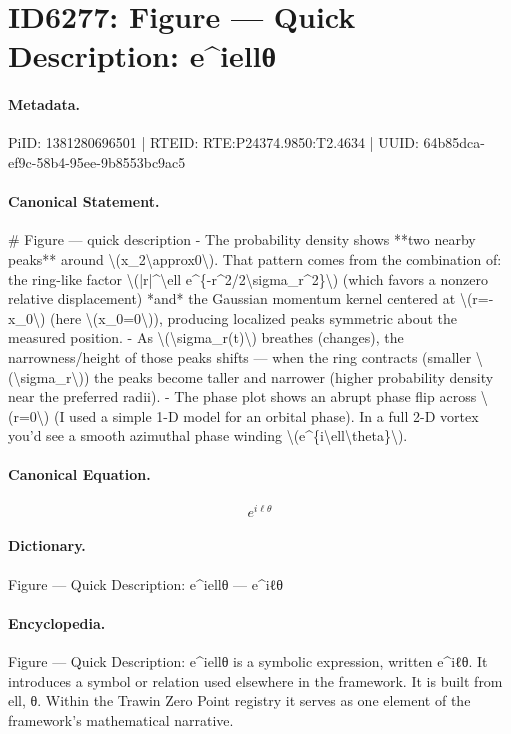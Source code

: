 \section*{ID6277: Figure — Quick Description: e\textasciicircum{}iellθ}
\paragraph{Metadata.}
PiID: 1381280696501 | RTEID: RTE:P24374.9850:T2.4634 | UUID: 64b85dca-ef9c-58b4-95ee-9b8553bc9ac5

\paragraph{Canonical Statement.}
\# Figure — quick description - The probability density shows **two nearby peaks** around \textbackslash{}(x\_2\textbackslash{}approx0\textbackslash{}). That pattern comes from the combination of: the ring-like factor \textbackslash{}(|r|\textasciicircum{}\textbackslash{}ell e\textasciicircum{}\{-r\textasciicircum{}2/2\textbackslash{}sigma\_r\textasciicircum{}2\}\textbackslash{}) (which favors a nonzero relative displacement) *and* the Gaussian momentum kernel centered at \textbackslash{}(r=-x\_0\textbackslash{}) (here \textbackslash{}(x\_0=0\textbackslash{})), producing localized peaks symmetric about the measured position. - As \textbackslash{}(\textbackslash{}sigma\_r(t)\textbackslash{}) breathes (changes), the narrowness/height of those peaks shifts — when the ring contracts (smaller \textbackslash{}(\textbackslash{}sigma\_r\textbackslash{})) the peaks become taller and narrower (higher probability density near the preferred radii). - The phase plot shows an abrupt phase flip across \textbackslash{}(r=0\textbackslash{}) (I used a simple 1-D model for an orbital phase). In a full 2-D vortex you’d see a smooth azimuthal phase winding \textbackslash{}(e\textasciicircum{}\{i\textbackslash{}ell\textbackslash{}theta\}\textbackslash{}).

\paragraph{Canonical Equation.}
\[
e^{i\ell\theta}
\]

\paragraph{Dictionary.}
Figure — Quick Description: e\textasciicircum{}iellθ — e\textasciicircum{}iℓθ

\paragraph{Encyclopedia.}
Figure — Quick Description: e\textasciicircum{}iellθ is a symbolic expression, written e\textasciicircum{}iℓθ. It introduces a symbol or relation used elsewhere in the framework. It is built from ell, θ. Within the Trawin Zero Point registry it serves as one element of the framework's mathematical narrative.
